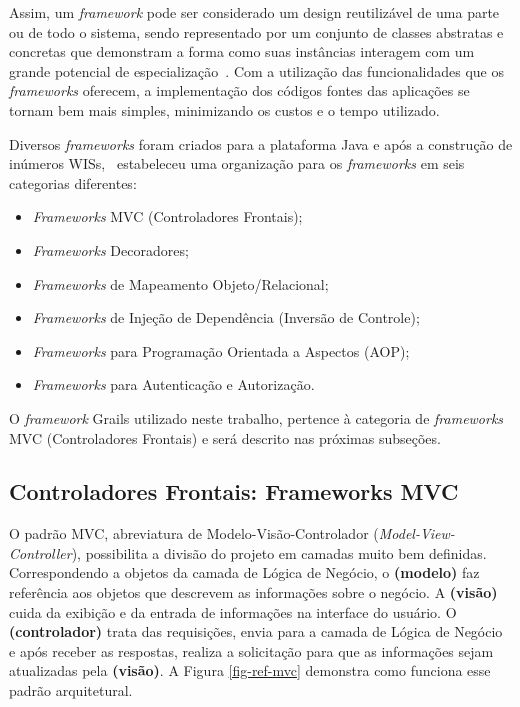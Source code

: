Assim, um \textit{framework} pode ser considerado um design reutilizável de uma parte ou de todo o sistema, sendo representado por um conjunto de classes abstratas e concretas que demonstram a forma como suas instâncias interagem com um grande potencial de especialização~\cite{mattsson-et-al:csef99}. Com a utilização das funcionalidades que os \textit{frameworks} oferecem, a implementação dos códigos fontes das aplicações se tornam bem mais simples, minimizando os custos e o tempo utilizado.

Diversos \textit{frameworks} foram criados para a plataforma Java e após a construção de inúmeros WISs,~ estabeleceu uma organização para os \textit{frameworks} em seis categorias diferentes:    

\begin{itemize} 
	
	\item \textit{Frameworks} MVC (Controladores Frontais);
	
	\item \textit{Frameworks} Decoradores;
	
	\item \textit{Frameworks} de Mapeamento Objeto/Relacional;
	
	\item \textit{Frameworks} de Injeção de Dependência (Inversão de Controle);
	
	\item \textit{Frameworks} para Programação Orientada a Aspectos (AOP);
	
	\item \textit{Frameworks} para Autenticação e Autorização.
   
\end{itemize}

O \textit{framework} Grails utilizado neste trabalho, pertence à categoria de \textit{frameworks} MVC (Controladores Frontais) e será descrito nas próximas subseções.

\subsection{Controladores Frontais: Frameworks MVC}
\label{sec-ref-framework-mvc}

O padrão MVC, abreviatura de Modelo-Visão-Controlador (\textit{Model-View-Controller}), possibilita a divisão do projeto em camadas muito bem definidas. Correspondendo a objetos da camada de Lógica de Negócio, o \textbf{(modelo)} faz referência aos objetos que descrevem as informações sobre o negócio. A \textbf{(visão)} cuida da exibição e da entrada de informações na interface do usuário. O \textbf{(controlador)} trata das requisições, envia para a camada de Lógica de Negócio e após receber as respostas, realiza a solicitação para que as informações sejam atualizadas pela \textbf{(visão)}. A Figura \ref{fig-ref-mvc} demonstra como funciona esse padrão arquitetural.  

